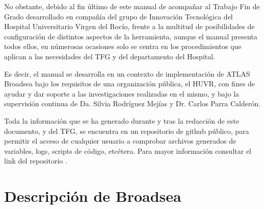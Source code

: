 
No obstante, debido al fin último de este manual de acompañar al Trabajo Fin de Grado desarrollado en compañía del grupo de Innovación Tecnológica del Hospital Universitario Virgen del Rocío,  frente a la multitud de posibilidades de configuración de distintos aspectos de la herramienta, aunque el manual presenta todos ellos, en númerosas ocasiones solo se centra en los procedimientos que aplican a las necesidades del TFG y del departamento del Hospital.

Es decir, el manual se desarrolla en un contexto de implementación de ATLAS Broadsea bajo los requisitos de una organización pública, el HUVR, con fines de ayudar y dar soporte a las investigaciones realizadas en el mismo, y bajo la supervisión continua de Da. Silvia Rodríguez Mejías y Dr. Carlos Parra Calderón.


Toda la información que se ha generado durante y tras la redacción de este documento, y del TFG, se encuentra en un repositorio de github público, para permitir el acceso de cualquier usuario a comprobar archivos generados de variables, logs, scripts de código, etcétera. Para mayor información consultar el link del repositorio \parencite{vallealonsodc}.

\section{Descripción de Broadsea} \label{sec:01descripBroadsea}



